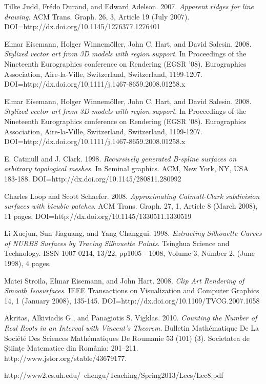 \documentclass[12pt, letterpaper]{article}
\begin{document}
\begin{thebibliography}{9}

Tilke Judd, Frédo Durand, and Edward Adelson. 2007. 
\emph{Apparent ridges for line drawing}. ACM Trans. Graph. 26, 3, Article 19 (July 2007). DOI=http://dx.doi.org/10.1145/1276377.1276401

Elmar Eisemann, Holger Winnemöller, John C. Hart, and David Salesin. 2008.
\emph{Stylized vector art from 3D models with region support}. In Proceedings of the Nineteenth Eurographics conference on Rendering (EGSR '08). Eurographics Association, Aire-la-Ville, Switzerland, Switzerland, 1199-1207. DOI=http://dx.doi.org/10.1111/j.1467-8659.2008.01258.x

Elmar Eisemann, Holger Winnemöller, John C. Hart, and David Salesin. 2008.
\emph{Stylized vector art from 3D models with region support}. In Proceedings of the Nineteenth Eurographics conference on Rendering (EGSR '08). Eurographics Association, Aire-la-Ville, Switzerland, Switzerland, 1199-1207. DOI=http://dx.doi.org/10.1111/j.1467-8659.2008.01258.x

E. Catmull and J. Clark. 1998. \emph{Recursively generated B-spline surfaces on arbitrary topological meshes.}
In Seminal graphics. ACM, New York, NY, USA 183-188. DOI=http://dx.doi.org/10.1145/280811.280992

Charles Loop and Scott Schaefer. 2008.
\emph{Approximating Catmull-Clark subdivision surfaces with bicubic patches}.
ACM Trans. Graph. 27, 1, Article 8 (March 2008), 11 pages. DOI=http://dx.doi.org/10.1145/1330511.1330519

Li Xuejun, Sun Jiaguang, and Yang Changgui. 1998.
\emph{Extracting Silhouette Curves of NURBS Surfaces by Tracing Silhouette Points}.
Tsinghua Science and Technology. ISSN 1007-0214, 13/22, pp1005 - 1008, Volume 3, Number 2. (June 1998), 4 pages.

Matei Stroila, Elmar Eisemann, and John Hart. 2008.
\emph{Clip Art Rendering of Smooth Isosurfaces}.
IEEE Transactions on Visualization and Computer Graphics 14, 1 (January 2008), 135-145. DOI=http://dx.doi.org/10.1109/TVCG.2007.1058

Akritas, Alkiviadis G., and Panagiotis S. Vigklas. 2010.
\emph{Counting the Number of Real Roots in an Interval with Vincent's Theorem}.
Bulletin Mathématique De La Société Des Sciences Mathématiques De Roumanie 53 (101) (3). Societatea de Științe Matematice din România: 201–211. http://www.jstor.org/stable/43679177.

http://www2.cs.uh.edu/~chengu/Teaching/Spring2013/Lecs/Lec8.pdf



\end{thebibliography}
\end{document}
